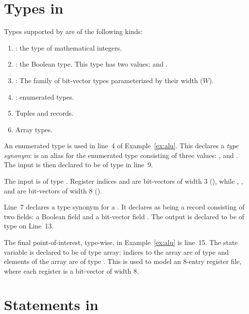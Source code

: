 \section{Types in \uclid{}}

Types supported by \uclid{} are of the following kinds: 
\begin{enumerate}
    \item {}: the type of mathematical integers.
    \item {}: the Boolean type. This type has two values:  and .
    \item {}: The family of bit-vector types parameterized by their width ($W$).
    \item {}: enumerated types.
    \item Tuples and records.
    \item Array types.
\end{enumerate}

An enumerated type is used in line~4 of Example~\ref{ex:alu}. This declares a \textit{type synonym}:  is an alias for the enumerated type consisting of three values: ,  and . The input  is then declared to be of type  in line~9. 

The input  is of type . Register indices  and  are bit-vectors of width 3 (), while , ,  and  are bit-vectors of width 8 ().

Line~7 declares a type synonym for a . It declares  as being a record consisting of two fields: a Boolean field  and a bit-vector field . The output  is declared to be of type  on Line~13.

The final point-of-interest, type-wise, in Example~\ref{ex:alu} is line~15. The state variable  is declared to be of type array: indices to the array are of type  and elements of the array are of type . This is used to model an 8-entry register file, where each register is a bit-vector of width 8.

\section{Statements in \uclid{}}

